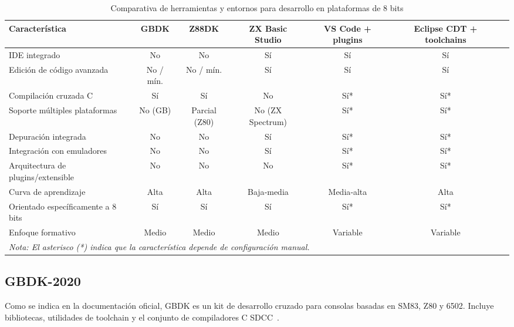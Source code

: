 \documentclass[../../main.tex]{subfiles}
\begin{document}
\begin{table}[!h]
    \centering
    {
        \begin{tabular}{|l|c|c|c|c|c|c|}
            \hline
            \textbf{Característica} & \textbf{GBDK} & \textbf{Z88DK} & \textbf{ZX Basic Studio} & \textbf{VS Code + plugins} & \textbf{Eclipse CDT + toolchains} \\
            \hline
            IDE integrado & No & No & Sí & Sí & Sí\\
            \hline
            Edición de código avanzada & No / mín. & No / mín. & Sí & Sí & Sí\\
            \hline
            Compilación cruzada C & Sí & Sí & No & Sí* & Sí*\\
            \hline
            Soporte múltiples plataformas & No (GB) & Parcial (Z80) & No (ZX Spectrum) & Sí* & Sí* \\ 
            \hline
            Depuración integrada & No & No & Sí & Sí* & Sí* \\
            \hline
            Integración con emuladores & No & No & Sí & Sí* & Sí* \\
            \hline
            Arquitectura de plugins/extensible & No & No & No & Sí* & Sí* \\
            \hline
            Curva de aprendizaje & Alta & Alta & Baja‑media & Media‑alta & Alta \\
            \hline
            Orientado específicamente a 8 bits & Sí & Sí & Sí & Sí* & Sí* \\
            \hline
            Enfoque formativo & Medio & Medio & Medio & Variable & Variable \\
            \hline
            \multicolumn{6}{|l|}{\textit{Nota: El asterisco (*) indica que la característica depende de configuración manual.}} \\
            \hline
        \end{tabular}
    }
    \caption{Comparativa de herramientas y entornos para desarrollo en plataformas de 8 bits}
    \label{tab:comparativa-ides}
\end{table}


\subsection{GBDK-2020}

Como se indica en la documentación oficial, GBDK es un kit de desarrollo cruzado para consolas basadas en SM83, Z80 y 6502. Incluye bibliotecas, utilidades de toolchain y el conjunto de compiladores C SDCC~\cite{gbdk}.
\end{document}
